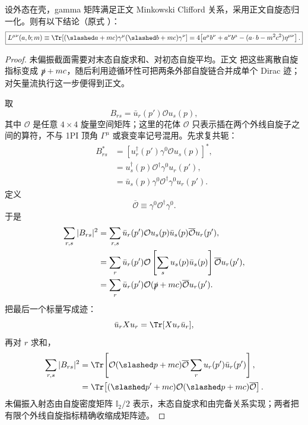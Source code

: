 \begin{proposition}
设外态在壳，gamma 矩阵满足正文 Minkowski Clifford 关系，采用正文自旋态归一化。则有以下结论（原式 ）：
\begin{equation*}
 \boxed{
 L^{\mu\nu}(a,b;m)
 \equiv
 \Tr[(\slashed a+mc)\gamma^\mu(\slashed b+mc)\gamma^\nu]
 =4\!
 \left[a^\mu b^\nu+a^\nu b^\mu
 -(a\!\cdot b-m^2c^2)\eta^{\mu\nu}\right].}
\end{equation*}
\end{proposition}
\begin{proof}
未偏振截面需要对末态自旋求和、对初态自旋平均。正文 把这些离散自旋指标变成 $\slashed p+mc$，随后利用迹循环性可把两条外部自旋链合并成单个 Dirac 迹；对矢量流执行这一步便得到正文。



取
\begin{equation*}
 B_{rs}=\bar u_r(p')\mathcal O u_s(p),
\end{equation*}
其中 $\mathcal O$ 是任意 $4\times4$ 旋量空间矩阵；这里的花体 $\mathcal O$ 只表示插在两个外线自旋子之间的算符，不与 1PI 顶角 $\Gamma^\mu$ 或衰变率记号混用。先求复共轭：
\begin{align*}
 B_{rs}^*
 &=[u_r^\dagger(p')\gamma^0\mathcal O u_s(p)]^*,\\
 &=u_s^\dagger(p)\mathcal O^\dagger\gamma^0u_r(p'),\\
 &=\bar u_s(p)\gamma^0\mathcal O^\dagger\gamma^0u_r(p').
\end{align*}
定义
\begin{equation*}
 \overline{\mathcal O}\equiv\gamma^0\mathcal O^\dagger\gamma^0.
\end{equation*}
于是
\begin{align*}
 \sum_{r,s}|B_{rs}|^2
 &=\sum_{r,s}
 \bar u_r(p')\mathcal O u_s(p)
 \bar u_s(p)\overline{\mathcal O} u_r(p'),\\
 &=\sum_r\bar u_r(p')\mathcal O
 \left[\sum_su_s(p)\bar u_s(p)\right]
 \overline{\mathcal O} u_r(p'),\\
 &=\sum_r\bar u_r(p')\mathcal O(\slashed p+mc)
 \overline{\mathcal O} u_r(p').
\end{align*}
把最后一个标量写成迹：
\begin{equation*}
 \bar u_r X u_r=\Tr[Xu_r\bar u_r],
\end{equation*}
再对 $r$ 求和，
\begin{align*}
 \sum_{r,s}|B_{rs}|^2
 &=\Tr\!\left[
 \mathcal O(\slashed p+mc)\overline{\mathcal O}
 \sum_ru_r(p')\bar u_r(p')
 \right],\\
 &={
 \Tr\!\left[(\slashed p'+mc)\mathcal O
 (\slashed p+mc)\overline{\mathcal O}\right].}
 \end{align*}
未偏振入射态由自旋密度矩阵 $\mathbb I_2/2$ 表示，末态自旋求和由完备关系实现；两者把有限个外线自旋指标精确收缩成矩阵迹。


\end{proof}
